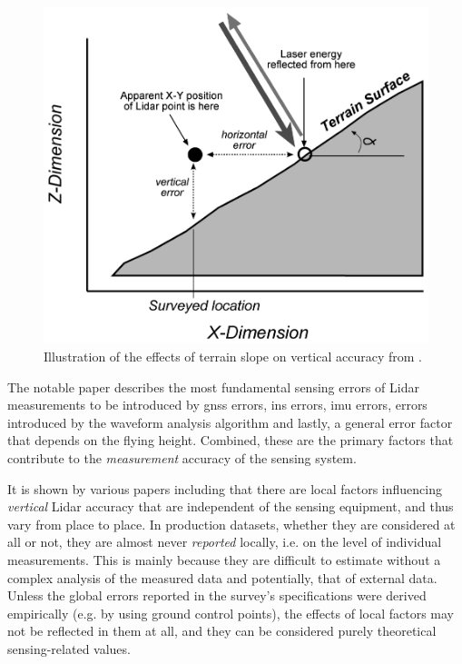 \begin{figure}
    \includegraphics[width=0.95\linewidth]{final_report/figs/hodgson_breshanan_2004_01.png} 
    \caption[Illustration of the effects of terrain slope on vertical accuracy]{Illustration of the effects of terrain slope on vertical accuracy from \cite{hodgson_breshanan_2004}.}
    \label{fig:elevationaccuracy}
\end{figure}

The notable paper \cite{hodgson_breshanan_2004} describes the most fundamental sensing errors of Lidar measurements to be introduced by \ac{gnss} errors, \ac{ins} errors, \ac{imu} errors, errors introduced by the waveform analysis algorithm and lastly, a general error factor that depends on the flying height. Combined, these are the primary factors that contribute to the \textit{measurement} accuracy of the sensing system.

It is shown by various papers including \cite{hodgson_breshanan_2004, su_bork_2006, kraus_etal_2006, raber_etal_2007, peng_shih_2006, chow_hodgson_2009, aguilar_etal_2005, aguilar_etal_2010, guo_etal_2010} that there are local factors influencing \textit{vertical} Lidar accuracy that are independent of the sensing equipment, and thus vary from place to place. In production datasets, whether they are considered at all or not, they are almost never \textit{reported} locally, i.e. on the level of individual measurements. This is mainly because they are difficult to estimate without a complex analysis of the measured data and potentially, that of external data. Unless the global errors reported in the survey's specifications were derived empirically (e.g. by using ground control points), the effects of local factors may not be reflected in them at all, and they can be considered purely theoretical sensing-related values.

